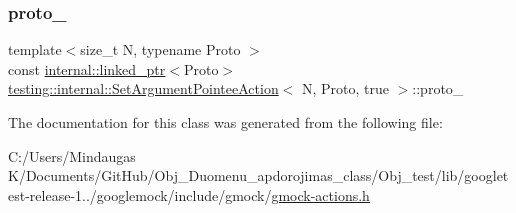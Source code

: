 \subsubsection{\texorpdfstring{proto\_}{proto\_}}
{\footnotesize\ttfamily template$<$size\+\_\+t N, typename Proto $>$ \\
const \mbox{\hyperlink{classtesting_1_1internal_1_1linked__ptr}{internal\+::linked\+\_\+ptr}}$<$Proto$>$ \mbox{\hyperlink{structtesting_1_1internal_1_1_set_argument_pointee_action}{testing\+::internal\+::\+Set\+Argument\+Pointee\+Action}}$<$ N, Proto, true $>$\+::proto\+\_\+\hspace{0.3cm}{\ttfamily [private]}}



The documentation for this class was generated from the following file\+:\begin{DoxyCompactItemize}
\item 
C\+:/\+Users/\+Mindaugas K/\+Documents/\+Git\+Hub/\+Obj\+\_\+\+Duomenu\+\_\+apdorojimas\+\_\+class/\+Obj\+\_\+test/lib/googletest-\/release-\/1../googlemock/include/gmock/\mbox{\hyperlink{_obj__test_2lib_2googletest-release-1_88_81_2googlemock_2include_2gmock_2gmock-actions_8h}{gmock-\/actions.\+h}}\end{DoxyCompactItemize}
